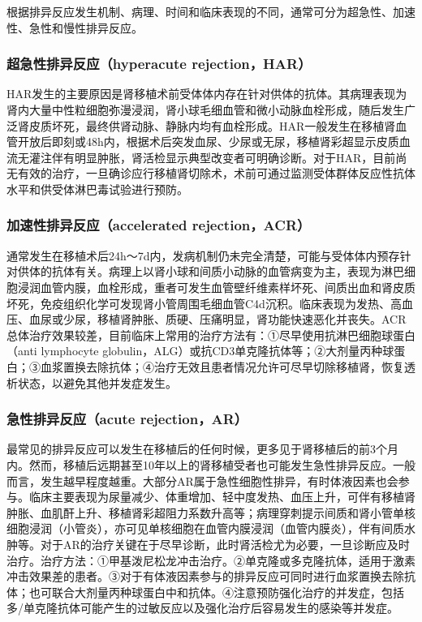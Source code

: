 根据排异反应发生机制、病理、时间和临床表现的不同，通常可分为超急性、加速性、急性和慢性排异反应。

\subsubsection{超急性排异反应（hyperacute rejection，HAR）}

HAR发生的主要原因是肾移植术前受体体内存在针对供体的抗体。其病理表现为肾内大量中性粒细胞弥漫浸润，肾小球毛细血管和微小动脉血栓形成，随后发生广泛肾皮质坏死，最终供肾动脉、静脉内均有血栓形成。HAR一般发生在移植肾血管开放后即刻或48h内，根据术后突发血尿、少尿或无尿，移植肾彩超显示皮质血流无灌注伴有明显肿胀，肾活检显示典型改变者可明确诊断。对于HAR，目前尚无有效的治疗，一旦确诊应行移植肾切除术，术前可通过监测受体群体反应性抗体水平和供受体淋巴毒试验进行预防。

\subsubsection{加速性排异反应（accelerated rejection，ACR）}

通常发生在移植术后24h～7d内，发病机制仍未完全清楚，可能与受体体内预存针对供体的抗体有关。病理上以肾小球和间质小动脉的血管病变为主，表现为淋巴细胞浸润血管内膜，血栓形成，重者可发生血管壁纤维素样坏死、间质出血和肾皮质坏死，免疫组织化学可发现肾小管周围毛细血管C4d沉积。临床表现为发热、高血压、血尿或少尿，移植肾肿胀、质硬、压痛明显，肾功能快速恶化并丧失。ACR总体治疗效果较差，目前临床上常用的治疗方法有：①尽早使用抗淋巴细胞球蛋白（anti
lymphocyte
globulin，ALG）或抗CD3单克隆抗体等；②大剂量丙种球蛋白；③血浆置换去除抗体；④治疗无效且患者情况允许可尽早切除移植肾，恢复透析状态，以避免其他并发症发生。

\subsubsection{急性排异反应（acute rejection，AR）}

最常见的排异反应可以发生在移植后的任何时候，更多见于肾移植后的前3个月内。然而，移植后远期甚至10年以上的肾移植受者也可能发生急性排异反应。一般而言，发生越早程度越重。大部分AR属于急性细胞性排异，有时体液因素也会参与。临床主要表现为尿量减少、体重增加、轻中度发热、血压上升，可伴有移植肾肿胀、血肌酐上升、移植肾彩超阻力系数升高等；病理穿刺提示间质和肾小管单核细胞浸润（小管炎），亦可见单核细胞在血管内膜浸润（血管内膜炎），伴有间质水肿等。对于AR的治疗关键在于尽早诊断，此时肾活检尤为必要，一旦诊断应及时治疗。治疗方法：①甲基泼尼松龙冲击治疗。②单克隆或多克隆抗体，适用于激素冲击效果差的患者。③对于有体液因素参与的排异反应可同时进行血浆置换去除抗体；也可联合大剂量丙种球蛋白中和抗体。④注意预防强化治疗的并发症，包括多/单克隆抗体可能产生的过敏反应以及强化治疗后容易发生的感染等并发症。

